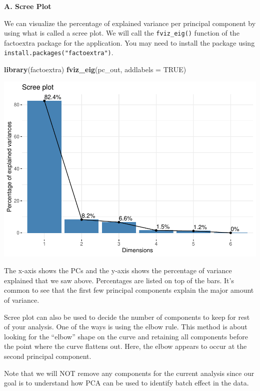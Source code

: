 \documentclass[
]{book}
\newenvironment{Shaded}{\begin{snugshade}}{\end{snugshade}}
\newcommand{\AttributeTok}[1]{\textcolor[rgb]{0.13,0.29,0.53}{#1}}
\newcommand{\ConstantTok}[1]{\textcolor[rgb]{0.56,0.35,0.01}{#1}}
\newcommand{\FunctionTok}[1]{\textcolor[rgb]{0.13,0.29,0.53}{\textbf{#1}}}
\newcommand{\NormalTok}[1]{#1}
\begin{document}
\textbf{A. Scree Plot}

We can visualize the percentage of explained variance per principal component by using what is called a scree plot. We will call the \texttt{fviz\_eig()} function of the factoextra package for the application. You may need to install the package using \texttt{install.packages("factoextra")}.

\begin{Shaded}
\begin{Highlighting}[]
\FunctionTok{library}\NormalTok{(factoextra)}
\FunctionTok{fviz\_eig}\NormalTok{(pc\_out, }
         \AttributeTok{addlabels =} \ConstantTok{TRUE}\NormalTok{)}
\end{Highlighting}
\end{Shaded}

\includegraphics{_main_files/figure-latex/unnamed-chunk-45-1.pdf}

The x-axis shows the PCs and the y-axis shows the percentage of variance explained that we saw above. Percentages are listed on top of the bars. It's common to see that the first few principal components explain the major amount of variance.

Scree plot can also be used to decide the number of components to keep for rest of your analysis. One of the ways is using the elbow rule. This method is about looking for the ``elbow'' shape on the curve and retaining all components before the point where the curve flattens out. Here, the elbow appears to occur at the second principal component.

Note that we will NOT remove any components for the current analysis since our goal is to understand how PCA can be used to identify batch effect in the data.
\end{document}
